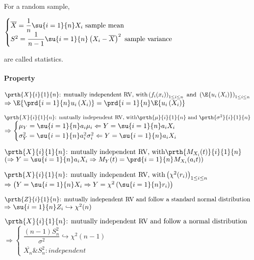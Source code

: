 For a random sample,
\begin{center}
	$
	\begin{cases}
		\overline{X}=\dfrac{1}{n}\su{ {i=1}}{n}X_{i}\text{ sample mean}\\
		S^{2}= \dfrac{1}{n-1}\su{ {i=1}}{n}\left( X_{i}-\overline{X} \right)^{2}\text{ sample variance}
	\end{cases}
	$
\end{center}
are called statistics.
\paragraph{Property}
\begin{center}
	$\prth{X}{i}{1}{n}\text{: mutually independent RV, with}\left(f_{i}(x_{i})\right)_{1\leq i\leq n}\text{ and }\left(\E{u_{i}\left( X_{i} \right)}\right)_{1\leq i\leq n}
	$
	$\Rightarrow\E{\prd{ {i=1}}{n}u_{i}\left( X_{i} \right)}=\prd{ {i=1}}{n}\E{u_{i}\left( X_{i} \right)}$ 
\end{center}
\begin{center}
	$\prth{X}{i}{1}{n}\text{: mutually independent RV, with}\prth{\mu}{i}{1}{n}\text{ and }\prth{\sigma^{2}}{i}{1}{n}
	$
	$\Rightarrow
	\begin{cases}
		\mu_{Y}=\su{ {i=1}}{n}a_{i}\mu_{i}\Leftarrow Y=\su{ {i=1}}{n}a_{i}X_{i}\\
		\sigma_{Y}^{2}=\su{ {i=1}}{n}a_{i}^{2}\sigma_{i}^{2}\Leftarrow Y=\su{ {i=1}}{n}a_{i}X_{i}
	\end{cases}
	$
\end{center}
\begin{center}
	$\prth{X}{i}{1}{n}\text{: mutually independent RV, with}\prth{M_{X_{i}}(t)}{i}{1}{n}
	$
	$\left( \Rightarrow Y=\su{ {i=1}}{n}a_{i}X_{i}\Rightarrow M_{Y}(t)=\prd{ {i=1}}{n}M_{X_{i}}(a_{i}t) \right)$
\end{center}
\begin{center}
	$\prth{X}{i}{1}{n}\text{: mutually independent RV, with}\left( \chi^{2}(r_{i}) \right)_{1\leq i\leq n}
	$
	$\Rightarrow\left(  Y=\su{ {i=1}}{n}X_{i}\Rightarrow Y=\chi^{2}\left( \su{ {i=1}}{n}r_{i} \right)\right)$
\end{center}
\begin{center}
	$\prth{Z}{i}{1}{n}\text{: mutually independent RV and follow a standard normal distribution}
	$
	$\Rightarrow\su{ {i=1}}{n}Z_{i}\hookrightarrow \chi^{2}(n)$
\end{center}
\begin{center}
	$\prth{X}{i}{1}{n}\text{: mutually independent RV and follow a normal distribution}
	$
	$\Rightarrow
	\begin{cases}
		\dfrac{(n-1)S_{n}^{2}}{\sigma^{2}}\hookrightarrow\chi^{2}(n-1)\\
		\overline{X_{n}}\&S_{n}^{2}: independent
	\end{cases}$
\end{center}

